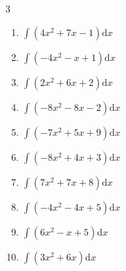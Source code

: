 \begin{multicols}{3}
\begin{enumerate}
\columnbreak %

  \item $\displaystyle \int \left( 4x^{2}+7x-1 \right) \mathrm{d}x$


  \item $\displaystyle \int \left( -4x^{2}-x+1 \right) \mathrm{d}x$


  \item $\displaystyle \int \left( 2x^{2}+6x+2 \right) \mathrm{d}x$


  \item $\displaystyle \int \left( -8x^{2}-8x-2 \right) \mathrm{d}x$


  \item $\displaystyle \int \left( -7x^{2}+5x+9 \right) \mathrm{d}x$


  \item $\displaystyle \int \left( -8x^{2}+4x+3 \right) \mathrm{d}x$


  \item $\displaystyle \int \left( 7x^{2}+7x+8 \right) \mathrm{d}x$


  \item $\displaystyle \int \left( -4x^{2}-4x+5 \right) \mathrm{d}x$


  \item $\displaystyle \int \left( 6x^{2}-x+5 \right) \mathrm{d}x$


  \item $\displaystyle \int \left( 3x^{2}+6x \right) \mathrm{d}x$



\end{enumerate}
\end{multicols}
